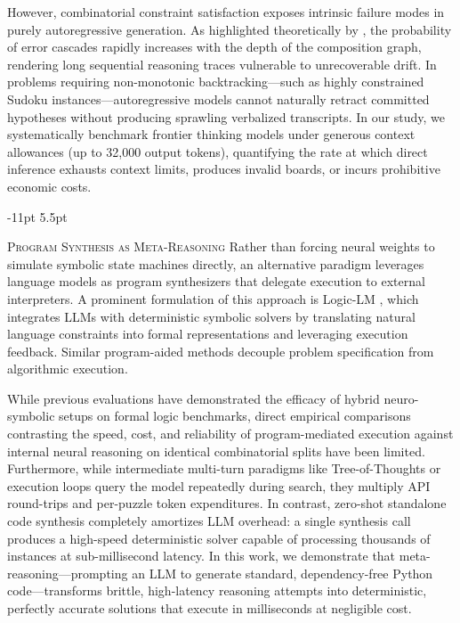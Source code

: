 \documentclass{article} %
\makeatletter
\renewcommand\subsection{\@startsection{subsection}{2}{\z@}%
  {-11pt \@plus -3pt \@minus -2pt}%
  {5.5pt \@plus 2pt}%
  {\normalfont\fontsize{10}{12}\selectfont\scshape\raggedright}}
\makeatother
\begin{document}
However, combinatorial constraint satisfaction exposes intrinsic failure modes in purely autoregressive generation. As highlighted theoretically by \citet{Dziri2023FaithFate}, the probability of error cascades rapidly increases with the depth of the composition graph, rendering long sequential reasoning traces vulnerable to unrecoverable drift. In problems requiring non-monotonic backtracking---such as highly constrained Sudoku instances---autoregressive models cannot naturally retract committed hypotheses without producing sprawling verbalized transcripts. In our study, we systematically benchmark frontier thinking models under generous context allowances (up to 32,000 output tokens), quantifying the rate at which direct inference exhausts context limits, produces invalid boards, or incurs prohibitive economic costs.

\subsection{\textsc{Program Synthesis as Meta-Reasoning}}
Rather than forcing neural weights to simulate symbolic state machines directly, an alternative paradigm leverages language models as program synthesizers that delegate execution to external interpreters. A prominent formulation of this approach is Logic-LM \citep{Pan2023LogiclmEmpowering}, which integrates LLMs with deterministic symbolic solvers by translating natural language constraints into formal representations and leveraging execution feedback. Similar program-aided methods decouple problem specification from algorithmic execution.

While previous evaluations have demonstrated the efficacy of hybrid neuro-symbolic setups on formal logic benchmarks, direct empirical comparisons contrasting the speed, cost, and reliability of program-mediated execution against internal neural reasoning on identical combinatorial splits have been limited. Furthermore, while intermediate multi-turn paradigms like Tree-of-Thoughts or execution loops query the model repeatedly during search, they multiply API round-trips and per-puzzle token expenditures. In contrast, zero-shot standalone code synthesis completely amortizes LLM overhead: a single synthesis call produces a high-speed deterministic solver capable of processing thousands of instances at sub-millisecond latency. In this work, we demonstrate that meta-reasoning---prompting an LLM to generate standard, dependency-free Python code---transforms brittle, high-latency reasoning attempts into deterministic, perfectly accurate solutions that execute in milliseconds at negligible cost.
\end{document}
